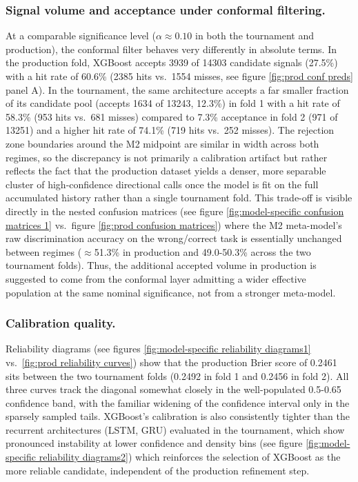 \documentclass[12pt, a4paper]{article}
\begin{document}
\subsubsection{Signal volume and acceptance under conformal filtering.} 
At a comparable significance level ($\alpha \approx 0.10$ in both the tournament and production), the conformal filter behaves very differently in absolute terms. 
In the production fold, XGBoost accepts 3939 of 14303 candidate signals (27.5\%) with a hit rate of 60.6\% (2385 hits vs.\ 1554 misses, see figure \ref{fig:prod conf preds} panel A). 
In the tournament, the same architecture accepts a far smaller fraction of its candidate pool (accepts 1634 of 13243, 12.3\%) in fold 1 with a hit rate of 58.3\% (953 hits vs.\ 681 misses) 
compared to 7.3\% acceptance in fold 2 (971 of 13251) and a higher hit rate of 74.1\% (719 hits vs.\ 252 misses). The rejection zone boundaries around the M2 midpoint are 
similar in width across both regimes, so the discrepancy is not primarily a calibration artifact but rather reflects the fact that the production dataset yields a denser, more 
separable cluster of high-confidence directional calls once the model is fit on the full accumulated history rather than a single tournament fold. This trade-off is visible directly 
in the nested confusion matrices (see figure \ref{fig:model-specific confusion matrices 1} vs.\ figure \ref{fig:prod confusion matrices}) where the M2 meta-model's raw 
discrimination accuracy on the wrong/correct task is essentially unchanged between regimes ($\approx$51.3\% in production and 49.0-50.3\% across the two tournament folds). 
Thus, the additional accepted volume in production is suggested to come from the conformal layer admitting a wider effective population at the same nominal significance, not 
from a stronger meta-model.


\subsubsection{Calibration quality.}
Reliability diagrams (see figures \ref{fig:model-specific reliability diagrams1} vs.\ \ref{fig:prod reliability curves}) show that the production Brier score of 0.2461 sits 
between the two tournament folds (0.2492 in fold 1 and 0.2456 in fold 2). All three curves track the diagonal somewhat closely in the well-populated 0.5-0.65 confidence band, 
with the familiar widening of the confidence interval only in the sparsely sampled tails. XGBoost's calibration is also consistently tighter than the recurrent architectures 
(LSTM, GRU) evaluated in the tournament, which show pronounced instability at lower confidence and density bins (see figure \ref{fig:model-specific reliability diagrams2}) which 
reinforces the selection of XGBoost as the more reliable candidate, independent of the production refinement step.
\end{document}

